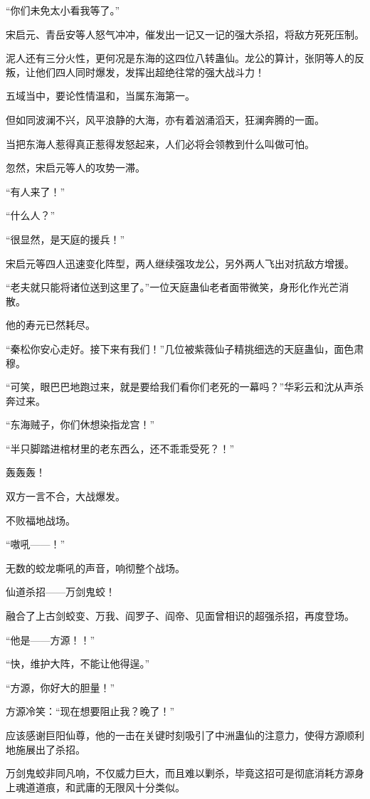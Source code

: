 \begin{this_body}
“你们未免太小看我等了。”

宋启元、青岳安等人怒气冲冲，催发出一记又一记的强大杀招，将敌方死死压制。

泥人还有三分火性，更何况是东海的这四位八转蛊仙。龙公的算计，张阴等人的反叛，让他们四人同时爆发，发挥出超绝往常的强大战斗力！

五域当中，要论性情温和，当属东海第一。

但如同波澜不兴，风平浪静的大海，亦有着汹涌滔天，狂澜奔腾的一面。

当把东海人惹得真正惹得发怒起来，人们必将会领教到什么叫做可怕。

忽然，宋启元等人的攻势一滞。

“有人来了！”

“什么人？”

“很显然，是天庭的援兵！”

宋启元等四人迅速变化阵型，两人继续强攻龙公，另外两人飞出对抗敌方增援。

“老夫就只能将诸位送到这里了。”一位天庭蛊仙老者面带微笑，身形化作光芒消散。

他的寿元已然耗尽。

“秦松你安心走好。接下来有我们！”几位被紫薇仙子精挑细选的天庭蛊仙，面色肃穆。

“可笑，眼巴巴地跑过来，就是要给我们看你们老死的一幕吗？”华彩云和沈从声杀奔过来。

“东海贼子，你们休想染指龙宫！”

“半只脚踏进棺材里的老东西么，还不乖乖受死？！”

轰轰轰！

双方一言不合，大战爆发。

不败福地战场。

“嗷吼——！”

无数的蛟龙嘶吼的声音，响彻整个战场。

仙道杀招——万剑鬼蛟！

融合了上古剑蛟变、万我、阎罗子、阎帝、见面曾相识的超强杀招，再度登场。

“他是——方源！！”

“快，维护大阵，不能让他得逞。”

“方源，你好大的胆量！”

方源冷笑：“现在想要阻止我？晚了！”

应该感谢巨阳仙尊，他的一击在关键时刻吸引了中洲蛊仙的注意力，使得方源顺利地施展出了杀招。

万剑鬼蛟非同凡响，不仅威力巨大，而且难以剿杀，毕竟这招可是彻底消耗方源身上魂道道痕，和武庸的无限风十分类似。


\end{this_body}
